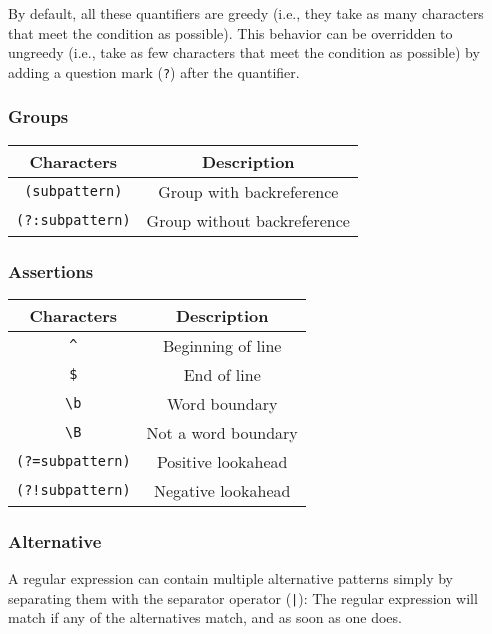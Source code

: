 By default, all these quantifiers are greedy (i.e., they take as many characters that meet the condition as possible). This behavior can be overridden to ungreedy (i.e., take as few characters that meet the condition as possible) by adding a question mark (\verb!?!) after the quantifier.

\subsubsection{Groups}
\begin{center}
	\begin{tabular}{|c|c|}
		\hline
		Characters				&	Description		\\
		\hline
		\verb!(subpattern)!		&	Group with backreference	\\
		\hline
		\verb!(?:subpattern)!	&	Group without backreference\\
		\hline
	\end{tabular}
\end{center}
\subsubsection{Assertions}
\begin{center}
	\begin{tabular}{|c|c|}
		\hline
		Characters				&	Description			\\
		\hline
		\verb!^!				&	Beginning of line\\
		\hline
		\verb!$!				&	End of line		\\
		\hline
		\verb!\b!				&	Word boundary	\\
		\hline
		\verb!\B!				&	Not a word boundary	\\
		\hline
		\verb!(?=subpattern)!	&	Positive lookahead	\\
		\hline
		\verb|(?!subpattern)|	&	Negative lookahead	\\
		\hline
	\end{tabular}
\end{center}
\subsubsection{Alternative}
A regular expression can contain multiple alternative patterns simply by separating them with the separator operator (\verb!|!): The regular expression will match if any of the alternatives match, and as soon as one does.

